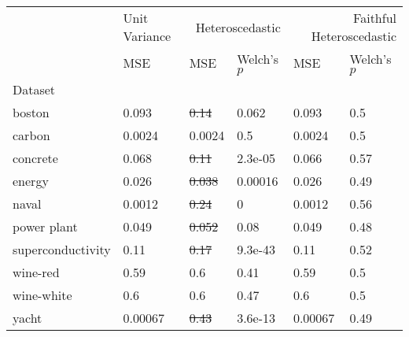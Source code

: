 \begin{tabular}{l|l|ll|ll}
\toprule
 & Unit Variance & \multicolumn{2}{r}{Heteroscedastic} & \multicolumn{2}{r}{Faithful Heteroscedastic} \\
 & MSE & MSE & Welch's $p$ & MSE & Welch's $p$ \\
Dataset &  &  &  &  &  \\
\midrule
boston & 0.093 & \sout{0.14} & 0.062 & 0.093 & 0.5 \\
carbon & 0.0024 & 0.0024 & 0.5 & 0.0024 & 0.5 \\
concrete & 0.068 & \sout{0.11} & 2.3e-05 & 0.066 & 0.57 \\
energy & 0.026 & \sout{0.038} & 0.00016 & 0.026 & 0.49 \\
naval & 0.0012 & \sout{0.24} & 0 & 0.0012 & 0.56 \\
power plant & 0.049 & \sout{0.052} & 0.08 & 0.049 & 0.48 \\
superconductivity & 0.11 & \sout{0.17} & 9.3e-43 & 0.11 & 0.52 \\
wine-red & 0.59 & 0.6 & 0.41 & 0.59 & 0.5 \\
wine-white & 0.6 & 0.6 & 0.47 & 0.6 & 0.5 \\
yacht & 0.00067 & \sout{0.43} & 3.6e-13 & 0.00067 & 0.49 \\
\bottomrule
\end{tabular}
